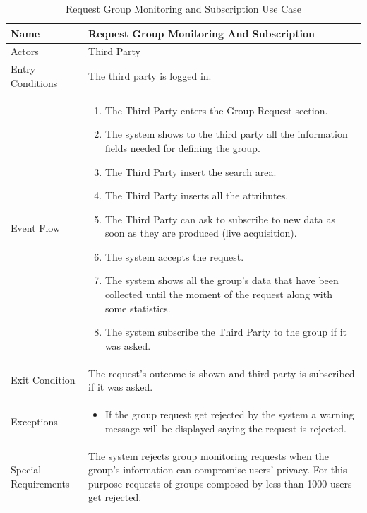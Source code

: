 \begin{enumerate}
\FloatBarrier
\begin{table}[h]
\begin{tabular}{|p{3.4cm}|p{}|}
\hline
Name             & Request Group Monitoring And Subscription \\ \hline
Actors           & Third Party  \\ \hline
Entry Conditions & The third party is logged in.    \\ \hline
Event Flow       & \begin{enumerate}
            \item The Third Party enters the Group Request section.
            \item The system shows to the third party all the information fields needed for defining the group.
            \item The Third Party insert the search area.
            \item The Third Party inserts all the attributes.
            \item The Third Party can ask to subscribe to new data as soon as they are produced (live acquisition).
            \item The system accepts the request.
            \item The system shows all the group's data that have been collected until the moment of the request along with some statistics. 
            \item The system subscribe the Third Party to the group if it was asked. 
        \end{enumerate}\\ \hline
Exit Condition   & The request's outcome is shown and third party is subscribed if it was asked.\\ \hline
Exceptions       & \begin{itemize}
\item If the group request get rejected by the system a warning message will be displayed saying the request is rejected.
\end{itemize}\\ \hline
Special Requirements & The system rejects group monitoring requests when the group's information can compromise users' privacy. For this purpose requests of groups composed by less than 1000 users get rejected.
\\ \hline
\end{tabular}
\caption{Request Group Monitoring and Subscription Use Case}
\end{table}
\FloatBarrier
\clearpage



\end{enumerate}
